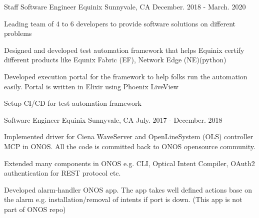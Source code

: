 \begin{cventries}
  \cventry
    {Staff Software Engineer} %
    {Equinix} %
    {Sunnyvale, CA} %
    {December. 2018 - March. 2020} %
    {
      \begin{cvitems} %
        \item {Leading team of 4 to 6 developers to provide software solutions on different problems}
        \item {Designed and developed test automation framework that helps Equinix certify different
               products like Equnix Fabric (EF), Network Edge (NE)(python)}
        \item {Developed execution portal for the framework to help folks run the automation easily. Portal is written in Elixir using Phoenix LiveView}
        \item {Setup CI/CD for test automation framework}
      \end{cvitems}
    }

  \cventry
    {Software Engineer} %
    {Equinix} %
    {Sunnyvale, CA} %
    {July. 2017 - December. 2018} %
    {
      \begin{cvitems} %
        \item {Implemented driver for Ciena WaveServer and OpenLineSystem (OLS) controller MCP in ONOS.
               All the code is committed back to ONOS opensource community.}
        \item {Extended many components in ONOS e.g. CLI, Optical Intent Compiler, OAuth2
               authentication for REST protocol etc.}
        \item {Developed alarm-handler ONOS app. The app takes well defined
               actions base on the alarm e.g. installation/removal of intents if port is down.
               (This app is not part of ONOS repo)}
      \end{cvitems}
    }


\end{cventries}
